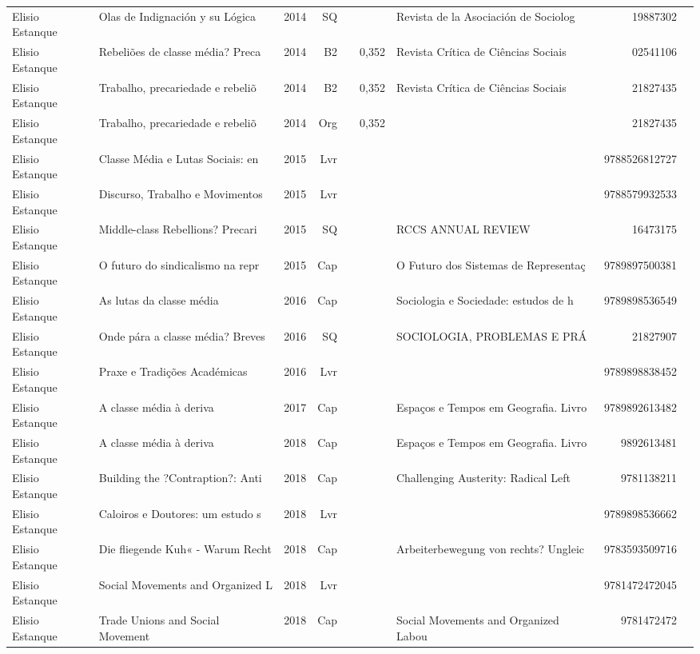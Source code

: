 \documentclass[12pt,brazil]{article}\usepackage[]{graphicx}\usepackage[]{xcolor}
\begin{document}
\begin{longtable}{lllrrllrr}
Elisio Estanque & Olas de Indignación y su Lógica  & 2014 & SQ &  &  & Revista de la Asociación de Sociolog & 19887302 \\
Elisio Estanque & Rebeliões de classe média? Preca & 2014 & B2 &  & 0,352 & Revista Crítica de Ciências Sociais & 02541106 \\
Elisio Estanque & Trabalho, precariedade e rebeliõ & 2014 & B2 &  & 0,352 & Revista Crítica de Ciências Sociais & 21827435 \\
Elisio Estanque & Trabalho, precariedade e rebeliõ & 2014 & Org &  & 0,352 &  & 21827435 \\
Elisio Estanque & Classe Média e Lutas Sociais: en & 2015 & Lvr &  &  &  & 9788526812727 \\
Elisio Estanque & Discurso, Trabalho e Movimentos  & 2015 & Lvr &  &  &  & 9788579932533 \\
Elisio Estanque & Middle-class Rebellions? Precari & 2015 & SQ &  &  & RCCS ANNUAL REVIEW & 16473175 \\
Elisio Estanque & O futuro do sindicalismo na repr & 2015 & Cap &  &  & O Futuro dos Sistemas de Representaç & 9789897500381 \\
Elisio Estanque & As lutas da classe média & 2016 & Cap &  &  & Sociologia e Sociedade: estudos de h & 9789898536549 \\
Elisio Estanque & Onde pára a classe média? Breves & 2016 & SQ &  &  & SOCIOLOGIA, PROBLEMAS E PRÁ & 21827907 \\
Elisio Estanque & Praxe e Tradições Académicas & 2016 & Lvr &  &  &  & 9789898838452 \\
Elisio Estanque & A classe média à deriva & 2017 & Cap &  &  & Espaços e Tempos em Geografia. Livro & 9789892613482 \\
\rowcolor{duplic}Elisio Estanque & A classe média à deriva & 2018 & Cap &  &  & Espaços e Tempos em Geografia. Livro & 9892613481 \\
Elisio Estanque & Building the ?Contraption?: Anti & 2018 & Cap &  &  & Challenging Austerity: Radical Left  & 9781138211 \\
Elisio Estanque & Caloiros e Doutores: um estudo s & 2018 & Lvr &  &  &  & 9789898536662 \\
Elisio Estanque & Die fliegende Kuh« - Warum Recht & 2018 & Cap &  &  & Arbeiterbewegung von rechts? Ungleic & 9783593509716 \\
Elisio Estanque & Social Movements and Organized L & 2018 & Lvr &  &  &  & 9781472472045 \\
Elisio Estanque & Trade Unions and Social Movement & 2018 & Cap &  &  & Social Movements and Organized Labou & 9781472472 \\

\end{longtable}
\end{document}
